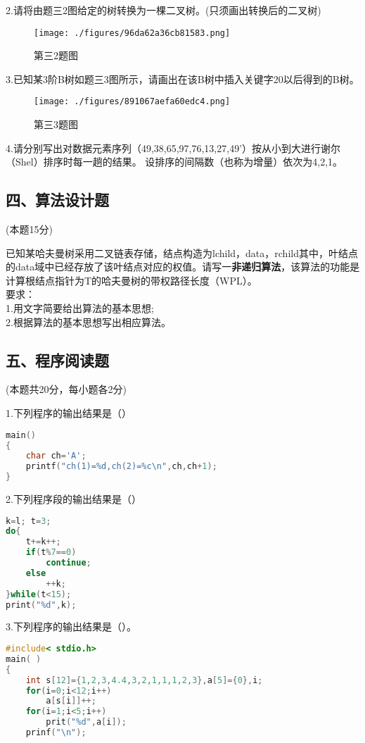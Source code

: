 2.请将由题三2图给定的树转换为一棵二叉树。(只须画出转换后的二叉树)
\begin{figure}[ht]
\centering
\texttt{[image: ./figures/96da62a36cb81583.png]}
\caption{第三2题图} \label{fig_BA11_1}
\end{figure}

3.已知某3阶B树如题三3图所示，请画出在该B树中插入关键字20以后得到的B树。
\begin{figure}[ht]
\centering
\texttt{[image: ./figures/891067aefa60edc4.png]}
\caption{第三3题图} \label{fig_BA11_2}
\end{figure}

4.请分别写出对数据元素序列（49,38,65,97,76,13,27,49'）按从小到大进行谢尔（Shel）排序时每一趟的结果。 设排序的间隔数（也称为增量）依次为4,2,1。

\subsection{四、算法设计题}
(本题15分)

已知某哈夫曼树采用二叉链表存储，结点构造为lchild，data，rchild其中，叶结点的data域中已经存放了该叶结点对应的权值。请写一\textbf{非递归算法}，该算法的功能是计算根结点指针为T的哈夫曼树的带权路径长度（WPL）。 \\
要求： \\
1.用文字简要给出算法的基本思想; \\
2.根据算法的基本思想写出相应算法。

\subsection{五、程序阅读题}

(本题共20分，每小题各2分)

1.下列程序的输出结果是（） \\
\begin{lstlisting}[language=cpp]
main()
{
    char ch='A';
    printf("ch(1)=%d,ch(2)=%c\n",ch,ch+1);
}
\end{lstlisting}

2.下列程序段的输出结果是（）
\begin{lstlisting}[language=cpp]
k=l; t=3;
do{
    t+=k++;
    if(t%7==0)
        continue;
    else
        ++k;
}while(t<15);
print("%d",k);
\end{lstlisting}

3.下列程序的输出结果是（）。
\begin{lstlisting}[language=cpp]
#include< stdio.h>
main( )
{
    int s[12]={1,2,3,4.4,3,2,1,1,1,2,3},a[5]={0},i;
    for(i=0;i<12;i++)
        a[s[i]]++;
    for(i=1;i<5;i++)
        prit("%d",a[i]);
    prinf("\n");
\end{lstlisting}

